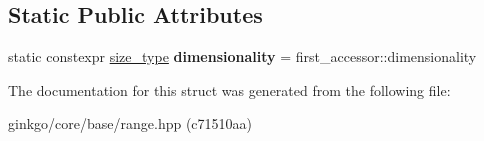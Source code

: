 \subsection*{Static Public Attributes}
\begin{DoxyCompactItemize}
\item 
\mbox{\label{structgko_1_1accessor_1_1mmul__operation_ae8057c37357eae7ea962f11aab54a38e}} 
static constexpr \hyperlink{namespacegko_a6e5c95df0ae4e47aab2f604a22d98ee7}{size\+\_\+type} {\bfseries dimensionality} = first\+\_\+accessor\+::dimensionality
\end{DoxyCompactItemize}


The documentation for this struct was generated from the following file\+:\begin{DoxyCompactItemize}
\item 
ginkgo/core/base/range.\+hpp (c71510aa)\end{DoxyCompactItemize}
